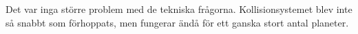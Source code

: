 Det var inga större problem med de tekniska frågorna.
Kollisionsystemet blev inte så snabbt som förhoppats,
men fungerar ändå för ett ganska stort antal planeter.


